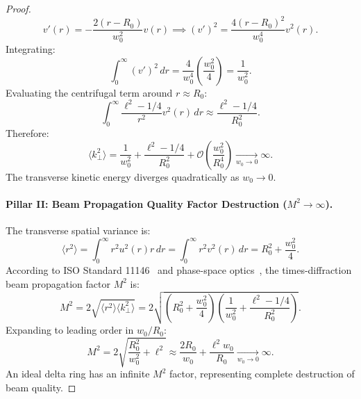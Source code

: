 \documentclass{optica-article}
\begin{document}
\begin{proof}
\begin{equation}
v'(r) = - \frac{2(r - R_0)}{w_0^2} v(r) \implies (v')^2 = \frac{4(r - R_0)^2}{w_0^4} v^2(r).
\label{eq:v_prime_squared}
\end{equation}
Integrating:
\begin{equation}
\int_0^\infty (v')^2 \, dr = \frac{4}{w_0^4} \left( \frac{w_0^2}{4} \right) = \frac{1}{w_0^2}.
\label{eq:v_prime_integral}
\end{equation}
Evaluating the centrifugal term around $r \approx R_0$:
\begin{equation}
\int_0^\infty \frac{\ell^2 - 1/4}{r^2} v^2(r) \, dr \approx \frac{\ell^2 - 1/4}{R_0^2}.
\label{eq:centrifugal_integral}
\end{equation}
Therefore:
\begin{equation}
\boxed{\langle k_\perp^2 \rangle = \frac{1}{w_0^2} + \frac{\ell^2 - 1/4}{R_0^2} + \mathcal{O}\left( \frac{w_0^2}{R_0^4} \right) \xrightarrow[w_0 \to 0]{} \infty.}
\label{eq:pillar1_result}
\end{equation}
The transverse kinetic energy diverges quadratically as $w_0 \to 0$.

\paragraph{Pillar II: Beam Propagation Quality Factor Destruction ($M^2 \to \infty$).}
The transverse spatial variance is:
\begin{equation}
\langle r^2 \rangle = \int_0^\infty r^2 u^2(r) r \, dr = \int_0^\infty r^2 v^2(r) \, dr = R_0^2 + \frac{w_0^2}{4}.
\label{eq:spatial_variance}
\end{equation}
According to ISO Standard 11146~\cite{ISO11146} and phase-space optics~\cite{Alonso2011}, the times-diffraction beam propagation factor $M^2$ is:
\begin{equation}
M^2 = 2 \sqrt{\langle r^2 \rangle \langle k_\perp^2 \rangle} = 2 \sqrt{\left( R_0^2 + \frac{w_0^2}{4} \right)\left( \frac{1}{w_0^2} + \frac{\ell^2 - 1/4}{R_0^2} \right)}.
\label{eq:m2_formula}
\end{equation}
Expanding to leading order in $w_0 / R_0$:
\begin{equation}
\boxed{M^2 = 2 \sqrt{\frac{R_0^2}{w_0^2} + \ell^2} \approx \frac{2 R_0}{w_0} + \frac{\ell^2 w_0}{R_0} \xrightarrow[w_0 \to 0]{} \infty.}
\label{eq:pillar2_result}
\end{equation}
An ideal delta ring has an infinite $M^2$ factor, representing complete destruction of beam quality.


\end{proof}
\end{document}
